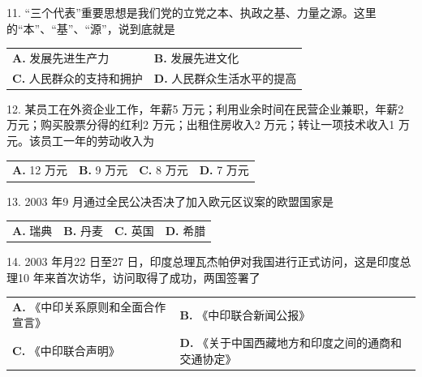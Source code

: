 \documentclass[UTF8,11pt]{ctexart}
\begin{document}
11. “三个代表”重要思想是我们党的立党之本、执政之基、力量之源。这里的“本”、“基”、“源”，说到底就是


\begin{center}\begin{tabular}{>{\raggedright\arraybackslash}p{\dimexpr(\linewidth-4\tabcolsep)/2\relax}>{\raggedright\arraybackslash}p{\dimexpr(\linewidth-4\tabcolsep)/2\relax}}
\textbf{A.} 发展先进生产力 & \textbf{B.} 发展先进文化\\[.35em]
\textbf{C.} 人民群众的支持和拥护 & \textbf{D.} 人民群众生活水平的提高\\[.35em]\end{tabular}\end{center}

12. 某员工在外资企业工作，年薪5 万元；利用业余时间在民营企业兼职，年薪2 万元；购买股票分得的红利2 万元；出租住房收入2 万元；转让一项技术收入1 万元。该员工一年的劳动收入为


\begin{center}\begin{tabular}{>{\raggedright\arraybackslash}p{\dimexpr(\linewidth-8\tabcolsep)/4\relax}>{\raggedright\arraybackslash}p{\dimexpr(\linewidth-8\tabcolsep)/4\relax}>{\raggedright\arraybackslash}p{\dimexpr(\linewidth-8\tabcolsep)/4\relax}>{\raggedright\arraybackslash}p{\dimexpr(\linewidth-8\tabcolsep)/4\relax}}
\textbf{A.} 12 万元 & \textbf{B.} 9 万元 & \textbf{C.} 8 万元 & \textbf{D.} 7 万元\\[.35em]\end{tabular}\end{center}

13. 2003 年9 月通过全民公决否决了加入欧元区议案的欧盟国家是


\begin{center}\begin{tabular}{>{\raggedright\arraybackslash}p{\dimexpr(\linewidth-8\tabcolsep)/4\relax}>{\raggedright\arraybackslash}p{\dimexpr(\linewidth-8\tabcolsep)/4\relax}>{\raggedright\arraybackslash}p{\dimexpr(\linewidth-8\tabcolsep)/4\relax}>{\raggedright\arraybackslash}p{\dimexpr(\linewidth-8\tabcolsep)/4\relax}}
\textbf{A.} 瑞典 & \textbf{B.} 丹麦 & \textbf{C.} 英国 & \textbf{D.} 希腊\\[.35em]\end{tabular}\end{center}

14. 2003 年月22 日至27 日，印度总理瓦杰帕伊对我国进行正式访问，这是印度总理10 年来首次访华，访问取得了成功，两国签署了


\begin{center}\begin{tabular}{>{\raggedright\arraybackslash}p{\dimexpr(\linewidth-4\tabcolsep)/2\relax}>{\raggedright\arraybackslash}p{\dimexpr(\linewidth-4\tabcolsep)/2\relax}}
\textbf{A.} 《中印关系原则和全面合作宣言》 & \textbf{B.} 《中印联合新闻公报》\\[.35em]
\textbf{C.} 《中印联合声明》 & \textbf{D.} 《关于中国西藏地方和印度之间的通商和交通协定》\\[.35em]\end{tabular}\end{center}
\end{document}
